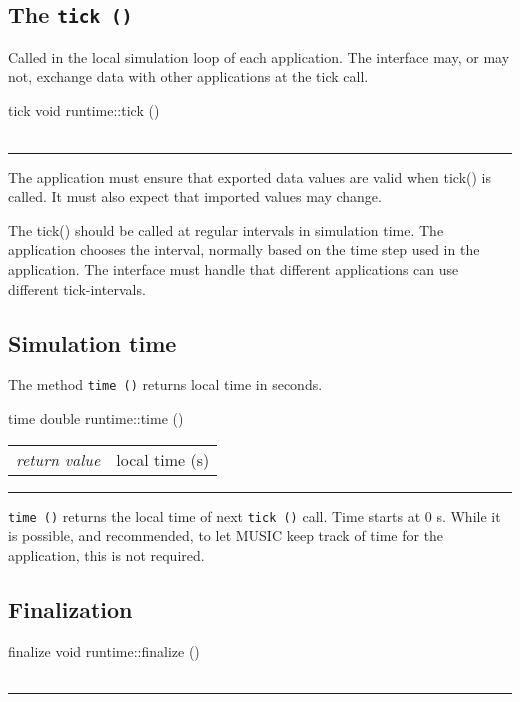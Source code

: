\documentclass[a4paper]{report}
\makeatletter
\newenvironment{parameters}%
{\begin{tabular}{@{\hspace{2em}}lp{0.6\textwidth}}}%
{\end{tabular}\par\vspace{1mm}\par\hrule\par\vspace{5mm}}
\makeatother
\begin{document}
\subsection{The \lstinline|tick ()|}

Called in the local simulation loop of each application.  The
interface may, or may not, exchange data with other applications at
the tick call.

\begin{head}{tick}
  void runtime::tick ()
\end{head}
\begin{parameters}
\end{parameters}

The application must ensure that exported data values are valid when
tick() is called.  It must also expect that imported values may change.

The tick() should be called at regular intervals in simulation time.
The application chooses the interval, normally based on the time step
used in the application.  The interface must handle that different
applications can use different tick-intervals.

\pagebreak
\subsection{Simulation time}

The method \lstinline|time ()| returns local time in seconds.

\begin{head}{time}
  double runtime::time ()
\end{head}
\begin{parameters}
  \emph{return value} & local time (s) \\
\end{parameters}

\lstinline|time ()| returns the local time of next \lstinline|tick ()|
call.  Time starts at 0 s.  While it is possible, and recommended, to
let MUSIC keep track of time for the application, this is not
required.

\subsection{Finalization}

\begin{head}{finalize}
  void runtime::finalize ()
\end{head}
\begin{parameters}
\end{parameters}
\end{document}
